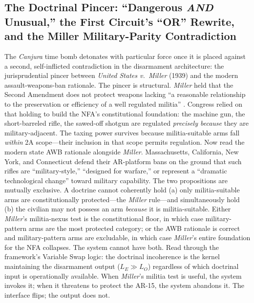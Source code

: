 \subsection{The Doctrinal Pincer: ``Dangerous \textit{AND} Unusual,'' the First Circuit's ``OR'' Rewrite, and the Miller Military-Parity Contradiction}
\label{subsec:doctrinal_pincer}

The \textit{Canjura} time bomb detonates with particular force once it is placed against a second, self-inflicted contradiction in the disarmament architecture: the jurisprudential pincer between \textit{United States v.\ Miller} (1939) and the modern assault-weapons-ban rationale. The pincer is structural. \textit{Miller} held that the Second Amendment does not protect weapons lacking ``a reasonable relationship to the preservation or efficiency of a well regulated militia'' \cite{dickinson_nfa, ebsco_nfa}. Congress relied on that holding to build the NFA's constitutional foundation: the machine gun, the short-barreled rifle, the sawed-off shotgun are regulated \textit{precisely because} they are military-adjacent. The taxing power survives because militia-suitable arms fall \textit{within} 2A scope---their inclusion in that scope permits regulation. Now read the modern state AWB rationale alongside \textit{Miller}. Massachusetts, California, New York, and Connecticut defend their AR-platform bans on the ground that such rifles are ``military-style,'' ``designed for warfare,'' or represent a ``dramatic technological change'' toward military capability. The two propositions are mutually exclusive. A doctrine cannot coherently hold (a) only militia-suitable arms are constitutionally protected---the \textit{Miller} rule---and simultaneously hold (b) the civilian may not possess an arm \textit{because} it is militia-suitable. Either \textit{Miller}'s militia-nexus test is the constitutional floor, in which case military-pattern arms are the most protected category; or the AWB rationale is correct and military-pattern arms are excludable, in which case \textit{Miller}'s entire foundation for the NFA collapses. The system cannot have both. Read through the framework's Variable Swap logic: the doctrinal incoherence is the kernel maintaining the disarmament output ($L_E \gg L_O$) regardless of which doctrinal input is operationally available. When \textit{Miller}'s militia test is useful, the system invokes it; when it threatens to protect the AR-15, the system abandons it. The interface flips; the output does not.

